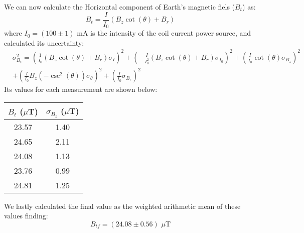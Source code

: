 We can now calculate the Horizontal component of Earth's magnetic fiels ($B_t$) as:
\begin{equation*}
    B_t=\frac{I}{I_0}(B_z \cot{(\theta)}+B_r)
\end{equation*}
where $I_0=(100\pm 1)$ mA is the intensity of the coil current power source, and calculated its uncertainty:
\begin{align*}
    &\sigma_{B_t}^2 = \left( \frac{1}{I_0} \left( B_z \cot(\theta) + B_r \right) \sigma_I \right)^2 + \left( -\frac{I}{I_0^2} \left( B_z \cot(\theta) + B_r \right) \sigma_{I_0} \right)^2 + \left( \frac{I}{I_0} \cot(\theta) \sigma_{B_z} \right)^2 \\
    &+ \left( \frac{I}{I_0} B_z \left( -\csc^2(\theta) \right) \sigma_\theta \right)^2 + \left( \frac{I}{I_0} \sigma_{B_r} \right)^2
\end{align*}
Its values for each measurement are shown below:
\begin{table}[H]
\centering
\begin{tabular}{|c|c|}
\hline
$B_t$ ($\mu$T) & $\sigma_{B_z}$ ($\mu$T) \\
\hline
23.57 & 1.40 \\
\hline
24.65 & 2.11 \\
\hline
24.08 & 1.13 \\
\hline
23.76 & 0.99 \\
\hline
24.81 & 1.25 \\
\hline
\end{tabular}
\end{table}
We lastly calculated the final value as the weighted arithmetic mean of these values finding:
\begin{equation*}
    B_{tf}=(24.08\pm0.56)\,\, \mu\mathrm{T}
\end{equation*}

